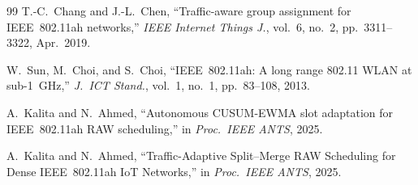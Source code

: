 \documentclass[conference]{IEEEtran}
\begin{document}
\begin{thebibliography}{99}
T.-C.~Chang and J.-L.~Chen, ``Traffic-aware group assignment for
IEEE~802.11ah networks,'' \emph{IEEE Internet Things J.},
vol.~6, no.~2, pp.~3311--3322, Apr.~2019.

W.~Sun, M.~Choi, and S.~Choi, ``IEEE~802.11ah: A long range 802.11
WLAN at sub-1~GHz,'' \emph{J.~ICT Stand.}, vol.~1, no.~1,
pp.~83--108, 2013.

A.~Kalita and N.~Ahmed, ``Autonomous CUSUM-EWMA slot adaptation for
IEEE~802.11ah RAW scheduling,'' in \emph{Proc.\ IEEE ANTS},
2025.

A.~Kalita and N.~Ahmed, ``Traffic-Adaptive Split--Merge RAW
Scheduling for Dense IEEE~802.11ah IoT Networks,'' in \emph{Proc.\
IEEE ANTS}, 2025.

\end{thebibliography}
\end{document}

